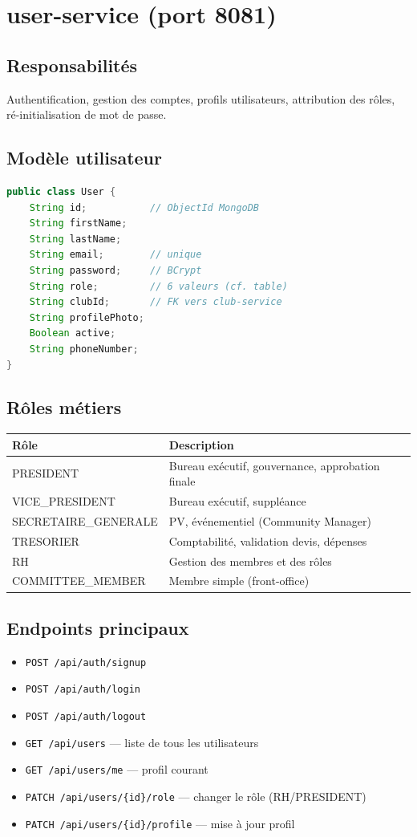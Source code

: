 \documentclass[11pt,a4paper]{report}
\begin{document}
\section{user-service (port 8081)}

\subsection{Responsabilités}
Authentification, gestion des comptes, profils utilisateurs, attribution des
rôles, ré-initialisation de mot de passe.

\subsection{Modèle utilisateur}
\begin{lstlisting}[language=java]
public class User {
    String id;           // ObjectId MongoDB
    String firstName;
    String lastName;
    String email;        // unique
    String password;     // BCrypt
    String role;         // 6 valeurs (cf. table)
    String clubId;       // FK vers club-service
    String profilePhoto;
    Boolean active;
    String phoneNumber;
}
\end{lstlisting}

\subsection{Rôles métiers}
\begin{tabular}{ll}
\toprule
\textbf{Rôle} & \textbf{Description} \\
\midrule
PRESIDENT             & Bureau exécutif, gouvernance, approbation finale \\
VICE\_PRESIDENT       & Bureau exécutif, suppléance \\
SECRETAIRE\_GENERALE  & PV, événementiel (Community Manager) \\
TRESORIER             & Comptabilité, validation devis, dépenses \\
RH                    & Gestion des membres et des rôles \\
COMMITTEE\_MEMBER     & Membre simple (front-office) \\
\bottomrule
\end{tabular}

\subsection{Endpoints principaux}
\begin{itemize}
  \item \texttt{POST /api/auth/signup}
  \item \texttt{POST /api/auth/login}
  \item \texttt{POST /api/auth/logout}
  \item \texttt{GET /api/users} — liste de tous les utilisateurs
  \item \texttt{GET /api/users/me} — profil courant
  \item \texttt{PATCH /api/users/\{id\}/role} — changer le rôle (RH/PRESIDENT)
  \item \texttt{PATCH /api/users/\{id\}/profile} — mise à jour profil
\end{itemize}
\end{document}
